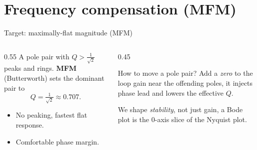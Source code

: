 \documentclass[aspectratio=169,9pt]{beamer}
\begin{document}
\section{Frequency compensation (MFM)}

\begin{frame}{Target: maximally-flat magnitude (MFM)}
  \begin{columns}[T]
    \begin{column}{0.55\textwidth}
      A pole pair with $Q>\tfrac{1}{\sqrt2}$ peaks and rings. \textbf{MFM} (Butterworth) sets the
      dominant pair to
      \[ Q=\tfrac{1}{\sqrt2}\approx0.707. \]
      \begin{itemize}
        \item No peaking, fastest flat response.
        \item Comfortable phase margin.
      \end{itemize}
    \end{column}
    \begin{column}{0.45\textwidth}
      \begin{block}{How to move a pole pair?}
        Add a \emph{zero} to the loop gain near the offending poles, it injects phase lead and
        lowers the effective $Q$.
      \end{block}
      \begin{whybox}
      We shape \emph{stability}, not just gain, a Bode plot is the $0$-axis slice of the
      Nyquist plot.
      \end{whybox}
    \end{column}
  \end{columns}
\end{frame}
\end{document}
